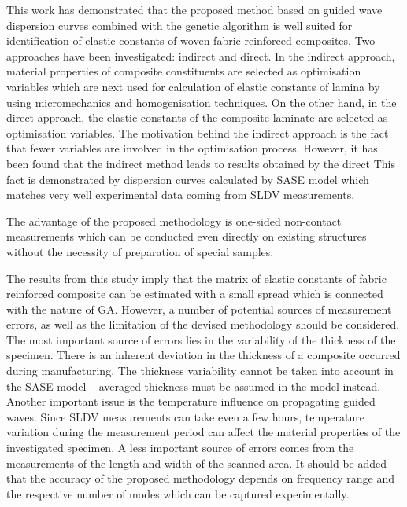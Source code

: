 	This work has demonstrated that the proposed method based on guided wave 
	dispersion curves combined with the genetic algorithm is well suited for identification 
	of elastic constants of woven fabric reinforced composites. Two approaches have 
	been investigated: indirect and direct.  In the indirect approach, material properties of 
	composite constituents are selected as optimisation variables which are next used 
	for calculation of elastic constants of lamina by using micromechanics and 
	homogenisation techniques. On the other hand, in the direct approach, the elastic 
	constants of the composite laminate are selected as optimisation variables. The 
	motivation behind the indirect approach is the fact that fewer variables are involved in 
	the optimisation process. However, it has been found that  the indirect method leads to  
	results   obtained by  the direct   This fact is demonstrated by  
	dispersion curves calculated by  SASE model which matches very well  
	experimental data coming from  SLDV measurements. 
	
	The advantage of the proposed methodology is one-sided non-contact measurements  which can be conducted even directly on existing structures without the necessity of preparation of special samples.
	
	The results from this study imply that the matrix of elastic constants of fabric reinforced composite can be estimated with a  small spread which is connected with the nature of GA. However, a number of potential sources of measurement errors, as well as the limitation of the devised methodology should be considered. The most important source of errors lies in the variability of the thickness of the specimen. There is an inherent deviation in the thickness of a composite occurred during manufacturing. The thickness variability cannot be taken into account in the SASE model -- averaged thickness must be assumed in the model instead. Another important issue is the temperature influence on propagating guided waves. Since SLDV measurements can take even a few hours, temperature variation during the measurement period can affect the material properties of the investigated specimen. A less important source of errors comes from the measurements of the length and width of the scanned area. It should be added that the accuracy of the proposed methodology depends on  frequency range and the respective number of modes which can be captured experimentally.
	

